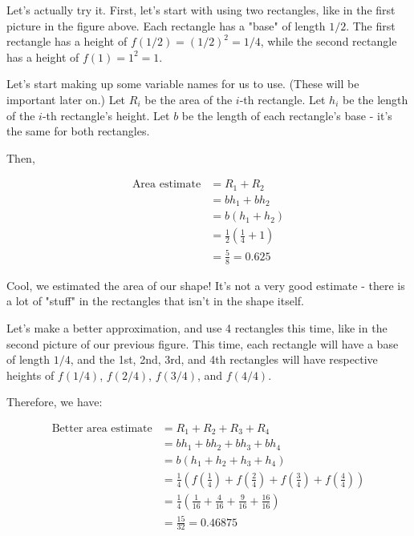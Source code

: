 \documentclass{article}
\begin{document}

Let's actually try it. First, let's start with using two rectangles, like in the first picture in the figure above. Each rectangle has a "base" of length $1/2$. The first rectangle has a height of $f(1/2) = (1/2)^2 = 1/4$, while the second rectangle has a height of $f(1) = 1^2 = 1$. 

Let's start making up some variable names for us to use. (These will be important later on.) Let $R_{i}$ be the area of the $i$-th rectangle. Let $h_{i}$ be the length of the $i$-th rectangle's height. Let $b$ be the length of each rectangle's base - it's the same for both rectangles.

Then,  

\begin{align*}
\text{Area estimate} &= R_1 + R_2 \\
&= b h_1 + b h_2 \\
&= b (h_1 + h_2) \\
&= \frac{1}{2} \left( \frac{1}{4} + 1 \right) \\
&= \frac{5}{8} = 0.625
\end{align*}

Cool, we estimated the area of our shape! It's not a very good estimate - there is a lot of "stuff" in the rectangles that isn't in the shape itself.

Let's make a better approximation, and use 4 rectangles this time, like in the second picture of our previous figure. This time, each rectangle will have a base of length $1/4$, and the 1st, 2nd, 3rd, and 4th rectangles will have respective heights of $f(1/4)$, $f(2/4)$, $f(3/4)$, and $f(4/4)$. 


Therefore, we have:  

\begin{align*}
\text{Better area estimate} &= R_1 + R_2 + R_3 + R_4 \\
&= b h_1 + b h_2 + b h_3 + b h_4 \\
&= b (h_1 + h_2 + h_3 + h_4) \\
&= \frac{1}{4} \left( f(\frac{1}{4}) + f(\frac{2}{4}) + f(\frac{3}{4}) + f(\frac{4}{4}) \right) \\
&= \frac{1}{4} \left( \frac{1}{16} + \frac{4}{16} + \frac{9}{16} + \frac{16}{16} \right) \\
&= \frac{15}{32} = 0.46875
\end{align*}
\end{document}
